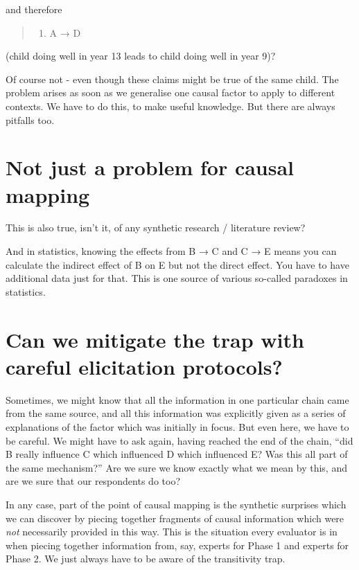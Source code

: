 \documentclass[
]{book}
\providecommand{\tightlist}{%
  \setlength{\itemsep}{0pt}\setlength{\parskip}{0pt}}
\begin{document}
and therefore

\begin{quote}
\begin{enumerate}
\def\labelenumi{\arabic{enumi})}
\setcounter{enumi}{3}
\tightlist
\item
  A → D
\end{enumerate}
\end{quote}

(child doing well in year 13 leads to child doing well in year 9)?

Of course not - even though these claims might be true of the same child. The problem arises as soon as we generalise one causal factor to apply to different contexts. We have to do this, to make useful knowledge. But there are always pitfalls too.

\hypertarget{not-just-a-problem-for-causal-mapping}{%
\section{Not just a problem for causal mapping}\label{not-just-a-problem-for-causal-mapping}}

This is also true, isn't it, of any synthetic research / literature review?

And in statistics, knowing the effects from B → C and C → E means you can calculate the indirect effect of B on E but not the direct effect. You have to have additional data just for that. This is one source of various so-called paradoxes in statistics.

\hypertarget{can-we-mitigate-the-trap-with-careful-elicitation-protocols}{%
\section{Can we mitigate the trap with careful elicitation protocols?}\label{can-we-mitigate-the-trap-with-careful-elicitation-protocols}}

Sometimes, we might know that all the information in one particular chain came from the same source, and all this information was explicitly given as a series of explanations of the factor which was initially in focus. But even here, we have to be careful. We might have to ask again, having reached the end of the chain, ``did B really influence C which influenced D which influenced E? Was this all part of the same mechanism?'' Are we sure we know exactly what we mean by this, and are we sure that our respondents do too?

In any case, part of the point of causal mapping is the synthetic surprises which we can discover by piecing together fragments of causal information which were \emph{not} necessarily provided in this way. This is the situation every evaluator is in when piecing together information from, say, experts for Phase 1 and experts for Phase 2. We just always have to be aware of the transitivity trap.
\end{document}
